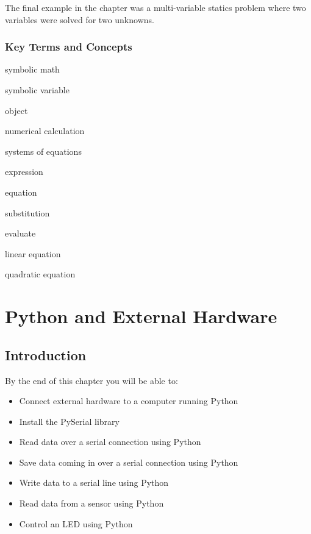 \documentclass{book}
\newenvironment{key_terms}{\begin{multicols}{3}}{\end{multicols}} %
\begin{document}
The final example in the chapter was a multi-variable statics problem
where two variables were solved for two unknowns.
    




    
        \hypertarget{key-terms-and-concepts}{%
\subsection{Key Terms and Concepts}\label{key-terms-and-concepts}}
    




    
        \begin{key_terms}
        symbolic math

symbolic variable

object

numerical calculation

systems of equations

expression

equation

substitution

evaluate

linear equation

quadratic equation
        \end{key_terms}

    




    
        \hypertarget{python-and-external-hardware}{%
\chapter{Python and External
Hardware}\label{python-and-external-hardware}}
    




    
        \hypertarget{introduction}{%
\section{Introduction}\label{introduction}}
    




    
        By the end of this chapter you will be able to:

\begin{itemize}
\item
  Connect external hardware to a computer running Python
\item
  Install the PySerial library
\item
  Read data over a serial connection using Python
\item
  Save data coming in over a serial connection using Python
\item
  Write data to a serial line using Python
\item
  Read data from a sensor using Python
\item
  Control an LED using Python
\end{itemize}
        \newpage
\end{document}
